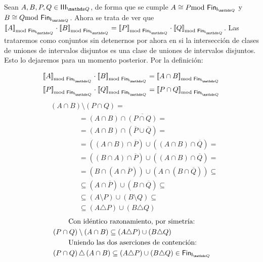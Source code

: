 \documentclass[final,12pt,a4paper,twoside,fleqn]{extbook}
\theoremstyle{definition}
\theoremstyle{remark}
\begin{document}
	Sean \(A,B,P,Q \in \IIIQ\), de forma que se cumple \(A \cong P
\FinDiffRel\) y \(B \cong Q \FinDiffRel\). Ahora se trata de ver que
\(\ClEqFinDiff{A}\cdot\ClEqFinDiff{B}=\ClEqFinDiff{P}\cdot\ClEqFinDiff{Q}\).
Las trataremos como conjuntos sin detenernos por ahora en si la intersección
de clases de uniones de intervalos disjuntos es una clase de uniones de
intervalos disjuntos. Esto lo dejaremos para un momento posterior. Por la
definición:



\begin{align}
&\ClEqFinDiff{A}\cdot\ClEqFinDiff{B} = \ClEqFinDiff{A\cap B}\\
&\ClEqFinDiff{P}\cdot\ClEqFinDiff{Q} = \ClEqFinDiff{P\cap Q}
\end{align}
\begin{align}
&\left(A \cap B\right)\setminus\left(P \cap Q\right) =  \\
&\qquad\qquad = \left(A \cap B\right)\cap\overline{\left(P \cap Q\right)} =
\\
&\qquad\qquad = \left(A \cap B\right)\cap {\left(\overline{P} \cup
\overline{Q}\right)} = \\
&\qquad\qquad = \left( \left( A \cap B \right) \cap \overline{P} \right) \cup
\left( \left( A \cap B \right) \cap \overline{Q} \right) = \\
&\qquad\qquad = \left( \left( B \cap A \right) \cap \overline{P} \right) \cup
\left( \left( A \cap B \right) \cap \overline{Q} \right) = \\
&\qquad\qquad = \left( B \cap \left( A \cap \overline{P} \right) \right) \cup
\left( A \cap \left( B \cap \overline{Q} \right) \right) \subseteq \\
&\qquad\qquad \subseteq \left( A \cap \overline{P} \right) \cup \left( B \cap
\overline{Q} \right) \subseteq \\
&\qquad\qquad \subseteq \left( A \setminus P \right) \cup \left( B \setminus
Q \right) \subseteq \\
&\qquad\qquad \subseteq \left( A \triangle P \right) \cup \left( B \triangle
Q \right)
\end{align}
\begin{align}
&\qquad \text{ Con idéntico razonamiento, por simetría:} \\
& \left(P \cap Q\right) \setminus \left(A \cap B\right) \subseteq \left( A
\triangle P \right) \cup \left( B \triangle Q \right)\\
&\qquad \text{ Uniendo las dos aserciones de contención:} \\
& \left(P \cap Q\right) \triangle \left(A \cap B\right) \subseteq \left( A
\triangle P \right) \cup \left( B \triangle Q \right) \in \FinIQ\\
\end{align}
\end{document}
